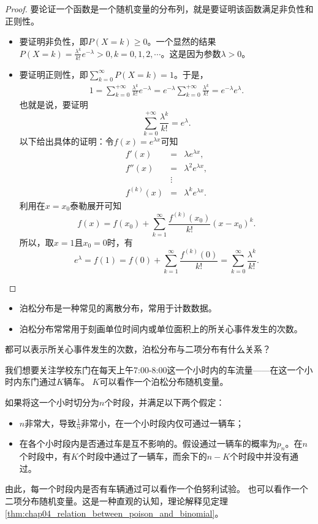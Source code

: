\begin{proof}
要论证一个函数是一个随机变量的分布列，就是要证明该函数满足非负性和正则性。
\begin{itemize}
    \item 要证明非负性，即$P(X= k ) \geq 0$。一个显然的结果$P(X=k)=\frac{\lambda ^{k} }{k!} e^{-\lambda } > 0,k=0,1,2,\cdots$。这是因为参数$\lambda>0$。
    \item 要证明正则性，即$\sum_{k=0}^\infty P(X=k) = 1$。于是，
    \begin{eqnarray*}
        1=\sum_{k=0}^{+\infty } \frac{\lambda ^{k} }{k!} e^{-\lambda } = e^{-\lambda }\sum_{k=0}^{+\infty }\frac{\lambda ^{k} }{k!}=e^{-\lambda }e^{\lambda }.
    \end{eqnarray*}
    也就是说，要证明$$
    \sum_{k=0}^{+\infty }\frac{\lambda ^{k} }{k!} = e^{\lambda }.
    $$
    以下给出具体的证明：令$f(x)=e^{\lambda x}$可知
     \begin{eqnarray*}
  f'(x)&=&\lambda e^{\lambda x}, \\ 
  f''(x)&=&\lambda^{2}  e^{\lambda x},\\ 
  &\vdots&\\
   f^{(k)}(x) &=&\lambda^{k}  e^{\lambda x}.
    \end{eqnarray*}
    利用在$x = x_0$泰勒展开可知
    $$
    f(x)=f(x_{0} )+\sum_{k=1}^{\infty } \frac{f^{(k)}(x_{0} )}{k!} (x-x_{0})^{k}.
    $$
    所以，取$x= 1$且$x_0=0$时，有
    $$e^{\lambda} = f(1)=f(0 )+\sum_{k=1}^{\infty } \frac{f^{(k)}(0)}{k!} = \sum_{k=0}^{\infty} \frac{\lambda^k}{k!}. $$
\end{itemize} 
\end{proof}
\begin{remark}
    \begin{itemize}
        \item 泊松分布是一种常见的离散分布，常用于计数数据。
        \item 泊松分布常常用于刻画单位时间内或单位面积上的所关心事件发生的次数。
    \end{itemize}
    \end{remark}
\begin{problem}
都可以表示所关心事件发生的次数，泊松分布与二项分布有什么关系？
\end{problem}
\begin{example}
我们想要关注学校东门在每天上午7:00-8:00这一个小时内的车流量——在这一个小时内东门通过$K$辆车。
$K$可以看作一个泊松分布随机变量。

如果将这一个小时切分为$n$个时段，并满足以下两个假定：
    \begin{itemize}
        \item $n$非常大，导致$\frac{1}{n} $非常小，在一个小时段内仅可通过一辆车；
        \item 在各个小时段内是否通过车是互不影响的。假设通过一辆车的概率为$p_{n}$。在$n$个时段中，有$K$个时段中通过了一辆车，而余下的$n-K$个时段中并没有通过。
    \end{itemize}

由此，每一个时段内是否有车辆通过可以看作一个伯努利试验。
也可以看作一个二项分布随机变量。这是一种直观的认知，理论解释见定理\ref{thm:chap04_relation_between_poison_and_binomial}。
\end{example}

